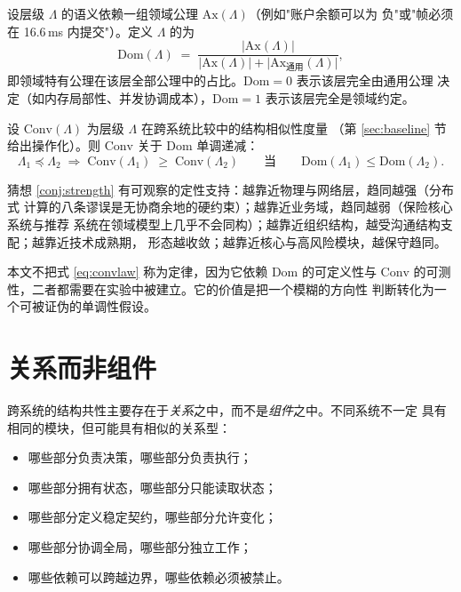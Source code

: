 \begin{definition}[领域绑定度]\label{def:dom}
设层级 $\Lambda$ 的语义依赖一组领域公理 $\mathrm{Ax}(\Lambda)$（例如"账户余额可以为
负"或"帧必须在 16.6\,ms 内提交"）。定义 $\Lambda$ 的为
\begin{equation}\label{eq:dom}
\mathrm{Dom}(\Lambda) \;=\; \frac{\bigl|\mathrm{Ax}(\Lambda)\bigr|}
{\bigl|\mathrm{Ax}(\Lambda)\bigr| + \bigl|\mathrm{Ax}_{\text{通用}}(\Lambda)\bigr|} ,
\end{equation}
即领域特有公理在该层全部公理中的占比。$\mathrm{Dom} = 0$ 表示该层完全由通用公理
决定（如内存局部性、并发协调成本），$\mathrm{Dom} = 1$ 表示该层完全是领域约定。
\end{definition}

\begin{conjecture}[收敛强度定律]\label{conj:strength}
设 $\mathrm{Conv}(\Lambda)$ 为层级 $\Lambda$ 在跨系统比较中的结构相似性度量
（第 \ref{sec:baseline} 节给出操作化）。则 $\mathrm{Conv}$ 关于
$\mathrm{Dom}$ 单调递减：
\begin{equation}\label{eq:convlaw}
\Lambda_1 \preceq \Lambda_2 \;\Longrightarrow\;
\mathrm{Conv}(\Lambda_1) \;\ge\; \mathrm{Conv}(\Lambda_2)
\qquad \text{当} \qquad
\mathrm{Dom}(\Lambda_1) \le \mathrm{Dom}(\Lambda_2).
\end{equation}
\end{conjecture}

猜想 \ref{conj:strength} 有可观察的定性支持：越靠近物理与网络层，趋同越强（分布式
计算的八条谬误是无协商余地的硬约束）；越靠近业务域，趋同越弱（保险核心系统与推荐
系统在领域模型上几乎不会同构）；越靠近组织结构，越受沟通结构支配；越靠近技术成熟期，
形态越收敛；越靠近核心与高风险模块，越保守趋同。

本文不把式 \eqref{eq:convlaw} 称为定律，因为它依赖 $\mathrm{Dom}$ 的可定义性与
$\mathrm{Conv}$ 的可测性，二者都需要在实验中被建立。它的价值是把一个模糊的方向性
判断转化为一个可被证伪的单调性假设。

\section{关系而非组件}\label{sec:relations-converge}

\begin{principle}[关系优先]\label{pr:relations}
跨系统的结构共性主要存在于\emph{关系}之中，而不是\emph{组件}之中。不同系统不一定
具有相同的模块，但可能具有相似的关系型：
\begin{itemize}
\item 哪些部分负责决策，哪些部分负责执行；
\item 哪些部分拥有状态，哪些部分只能读取状态；
\item 哪些部分定义稳定契约，哪些部分允许变化；
\item 哪些部分协调全局，哪些部分独立工作；
\item 哪些依赖可以跨越边界，哪些依赖必须被禁止。
\end{itemize}
\end{principle}

